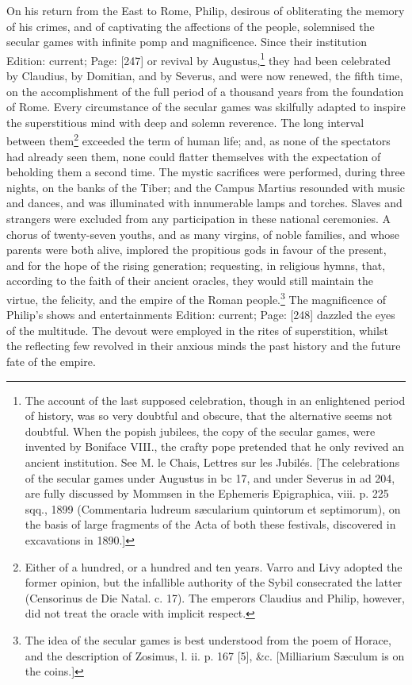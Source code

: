 On his return from the East to Rome, Philip, desirous of obliterating the memory of his crimes, and of captivating the affections of the people, solemnised the secular games with infinite pomp and magnificence. Since their institution Edition: current; Page: [247] or revival by Augustus,\footnote{The account of the last supposed celebration, though in an enlightened period of history, was so very doubtful and obscure, that the alternative seems not doubtful. When the popish jubilees, the copy of the secular games, were invented by Boniface VIII., the crafty pope pretended that he only revived an ancient institution. See M. le Chais, Lettres sur les Jubilés. [The celebrations of the secular games under Augustus in bc 17, and under Severus in ad 204, are fully discussed by Mommsen in the Ephemeris Epigraphica, viii. p. 225 sqq., 1899 (Commentaria ludreum sæcularium quintorum et septimorum), on the basis of large fragments of the Acta of both these festivals, discovered in excavations in 1890.]} they had been celebrated by Claudius, by Domitian, and by Severus, and were now renewed, the fifth time, on the accomplishment of the full period of a thousand years from the foundation of Rome. Every circumstance of the secular games was skilfully adapted to inspire the superstitious mind with deep and solemn reverence. The long interval between them\footnote{Either of a hundred, or a hundred and ten years. Varro and Livy adopted the former opinion, but the infallible authority of the Sybil consecrated the latter (Censorinus de Die Natal. c. 17). The emperors Claudius and Philip, however, did not treat the oracle with implicit respect.} exceeded the term of human life; and, as none of the spectators had already seen them, none could flatter themselves with the expectation of beholding them a second time. The mystic sacrifices were performed, during three nights, on the banks of the Tiber; and the Campus Martius resounded with music and dances, and was illuminated with innumerable lamps and torches. Slaves and strangers were excluded from any participation in these national ceremonies. A chorus of twenty-seven youths, and as many virgins, of noble families, and whose parents were both alive, implored the propitious gods in favour of the present, and for the hope of the rising generation; requesting, in religious hymns, that, according to the faith of their ancient oracles, they would still maintain the virtue, the felicity, and the empire of the Roman people.\footnote{The idea of the secular games is best understood from the poem of Horace, and the description of Zosimus, l. ii. p. 167 [5], \&c. [Milliarium Sæculum is on the coins.]} The magnificence of Philip\texthebrew{}’s shows and entertainments Edition: current; Page: [248] dazzled the eyes of the multitude. The devout were employed in the rites of superstition, whilst the reflecting few revolved in their anxious minds the past history and the future fate of the empire.


